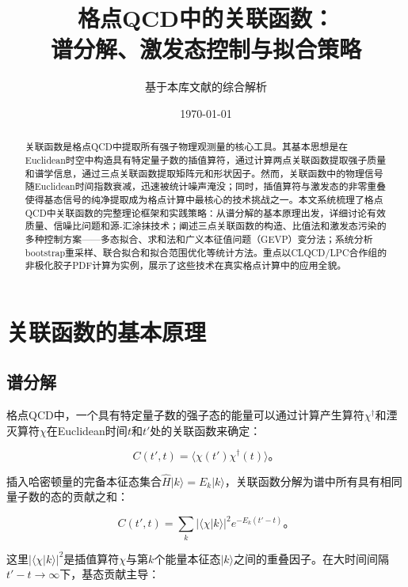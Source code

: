 \documentclass[12pt,a4paper]{ctexart}
\title{\heiti 格点QCD中的关联函数：\\
谱分解、激发态控制与拟合策略}
\author{基于本库文献的综合解析}
\date{\today}
\theoremstyle{definition}
\begin{document}
\maketitle

\begin{abstract}
\noindent
关联函数是格点QCD中提取所有强子物理观测量的核心工具。其基本思想是在Euclidean时空中构造具有特定量子数的插值算符，通过计算两点关联函数提取强子质量和谱学信息，通过三点关联函数提取矩阵元和形状因子。然而，关联函数中的物理信号随Euclidean时间指数衰减，迅速被统计噪声淹没；同时，插值算符与激发态的非零重叠使得基态信号的纯净提取成为格点计算中最核心的技术挑战之一。本文系统梳理了格点QCD中关联函数的完整理论框架和实践策略：从谱分解的基本原理出发，详细讨论有效质量、信噪比问题和源-汇涂抹技术；阐述三点关联函数的构造、比值法和激发态污染的多种控制方案——多态拟合、求和法和广义本征值问题（GEVP）变分法；系统分析bootstrap重采样、联合拟合和拟合范围优化等统计方法。重点以CLQCD/LPC合作组的非极化胶子PDF计算为实例，展示了这些技术在真实格点计算中的应用全貌。
\end{abstract}

\tableofcontents
\newpage

\section{关联函数的基本原理}

\subsection{谱分解}

格点QCD中，一个具有特定量子数的强子态的能量可以通过计算产生算符$\chi^\dagger$和湮灭算符$\chi$在Euclidean时间$t$和$t'$处的关联函数来确定\cite{Peardon2009}：

\begin{equation}
C(t', t) = \langle \chi(t') \chi^\dagger(t) \rangle。
\label{eq:correlator_basic}
\end{equation}

插入哈密顿量的完备本征态集合$\hat{H}|k\rangle = E_k|k\rangle$，关联函数分解为谱中所有具有相同量子数的态的贡献之和\cite{Peardon2009}：

\begin{equation}
\boxed{C(t', t) = \sum_k |\langle \chi|k\rangle|^2 e^{-E_k(t'-t)}}。
\label{eq:spectral_decomposition}
\end{equation}

这里$|\langle \chi|k\rangle|^2$是插值算符$\chi$与第$k$个能量本征态$|k\rangle$之间的重叠因子。在大时间间隔$t' - t \to \infty$下，基态贡献主导：
\end{document}
